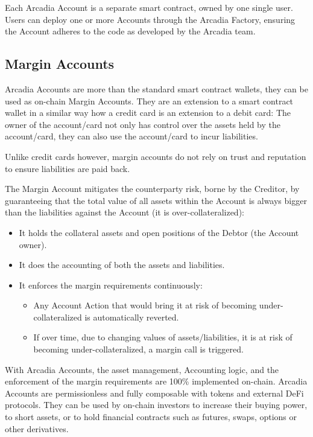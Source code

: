 \documentclass[sigconf,nonacm]{acmart}
\begin{document}
Each Arcadia Account is a separate smart contract, owned by one single user.
Users can deploy one or more Accounts through the Arcadia Factory, ensuring the Account adheres to the code as developed by the Arcadia team.

\subsection{Margin Accounts}
\label{subsec:margin-accounts}
Arcadia Accounts are more than the standard smart contract wallets, they can be used as on-chain Margin Accounts.
They are an extension to a smart contract wallet in a similar way how a credit card is an extension to a debit card:
The owner of the account/card not only has control over the assets held by the account/card,
they can also use the account/card to incur liabilities.

Unlike credit cards however, margin accounts do not rely on trust and reputation to ensure liabilities are paid back.

The Margin Account mitigates the counterparty risk, borne by the Creditor,
by guaranteeing that the total value of all assets within the Account is always bigger than the liabilities against the Account (it is over-collateralized):
\begin{itemize}
    \item It holds the collateral assets and open positions of the Debtor (the Account owner).
    \item It does the accounting of both the assets and liabilities.
    \item It enforces the margin requirements continuously:
    \begin{itemize}
        \item Any Account Action that would bring it at risk of becoming under-collateralized is automatically reverted.
        \item If over time, due to changing values of assets/liabilities, it is at risk of becoming under-collateralized, a margin call is triggered.
    \end{itemize}
\end{itemize}

With Arcadia Accounts, the asset management, Accounting logic, and the enforcement of the margin requirements are 100\% implemented on-chain.
Arcadia Accounts are permissionless and fully composable with tokens and external DeFi protocols.
They can be used by on-chain investors to increase their buying power, to short assets, or to hold financial contracts such as futures, swaps, options or other derivatives.
\end{document}
